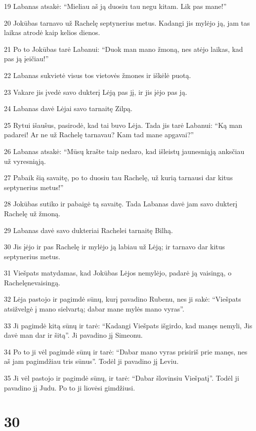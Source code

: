 \par 19 Labanas atsakė: “Mieliau aš ją duosiu tau negu kitam. Lik pas mane!” 
\par 20 Jokūbas tarnavo už Rachelę septynerius metus. Kadangi jis mylėjo ją, jam tas laikas atrodė kaip kelios dienos. 
\par 21 Po to Jokūbas tarė Labanui: “Duok man mano žmoną, nes atėjo laikas, kad pas ją įeičiau!” 
\par 22 Labanas sukvietė visus tos vietovės žmones ir iškėlė puotą. 
\par 23 Vakare jis įvedė savo dukterį Lėją pas jį, ir jis įėjo pas ją. 
\par 24 Labanas davė Lėjai savo tarnaitę Zilpą. 
\par 25 Rytui išaušus, pasirodė, kad tai buvo Lėja. Tada jis tarė Labanui: “Ką man padarei! Ar ne už Rachelę tarnavau? Kam tad mane apgavai?” 
\par 26 Labanas atsakė: “Mūsų krašte taip nedaro, kad išleistų jaunesniąją anksčiau už vyresniąją. 
\par 27 Pabaik šią savaitę, po to duosiu tau Rachelę, už kurią tarnausi dar kitus septynerius metus!” 
\par 28 Jokūbas sutiko ir pabaigė tą savaitę. Tada Labanas davė jam savo dukterį Rachelę už žmoną. 
\par 29 Labanas davė savo dukteriai Rachelei tarnaitę Bilhą. 
\par 30 Jis įėjo ir pas Rachelę ir mylėjo ją labiau už Lėją; ir tarnavo dar kitus septynerius metus. 
\par 31 Viešpats matydamas, kad Jokūbas Lėjos nemylėjo, padarė ją vaisingą, o Rachelę­nevaisingą. 
\par 32 Lėja pastojo ir pagimdė sūnų, kurį pavadino Rubenu, nes ji sakė: “Viešpats atsižvelgė į mano sielvartą; dabar mane mylės mano vyras”. 
\par 33 Ji pagimdė kitą sūnų ir tarė: “Kadangi Viešpats išgirdo, kad manęs nemyli, Jis davė man dar ir šitą”. Ji pavadino jį Simeonu. 
\par 34 Po to ji vėl pagimdė sūnų ir tarė: “Dabar mano vyras prisiriš prie manęs, nes aš jam pagimdžiau tris sūnus”. Todėl ji pavadino jį Leviu. 
\par 35 Ji vėl pastojo ir pagimdė sūnų, ir tarė: “Dabar šlovinsiu Viešpatį”. Todėl ji pavadino jį Judu. Po to ji liovėsi gimdžiusi.



\chapter{30}

